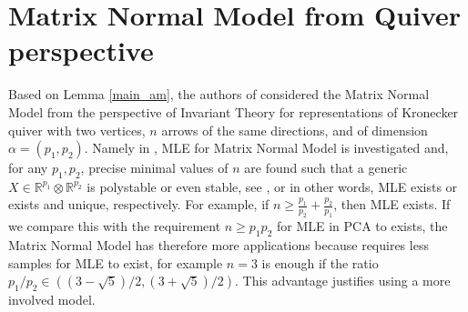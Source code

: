 \documentclass[reqno]{amsart}
\theoremstyle{plain}
\theoremstyle{definition}
\theoremstyle{remark}
\newcommand{\Rl}{\mathbb R}
\begin{document}
\section{Matrix Normal Model from Quiver perspective} Based on Lemma \ref{main_am},
the authors of \cite{dm} considered the Matrix Normal Model from the perspective of Invariant Theory for representations of  Kronecker quiver with two vertices, $n$ arrows of the same directions, and of dimension $\alpha=(p_1,p_2)$.  Namely in \cite{dm}, MLE for Matrix Normal Model is investigated and, for any $p_1,p_2$, precise minimal values of $n$ are found such that a generic $X\in \Rl^{p_1}\otimes \Rl^{p_2}$ is polystable or even stable, see \cite[Theorem~1.2]{dm}, or in other words, MLE exists or exists and unique, respectively. For example, if $n\geq \frac{p_1}{p_2}+\frac{p_2}{p_1}$, then MLE exists. If we compare this with the requirement $n\geq p_1p_2$ for MLE in PCA to exists, the Matrix Normal Model has therefore more applications because requires less samples for MLE to exist, for example $n=3$ is enough if the ratio $p_1/p_2\in((3-\sqrt{5})/2,(3+\sqrt{5})/2)$. This advantage justifies using a more involved model.
\end{document}

